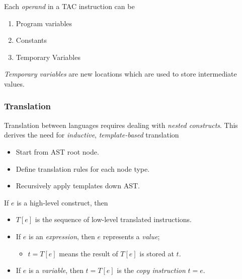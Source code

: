 \begin{definition}
    Each \textit{operand} in a TAC instruction can be
    \begin{enumerate}
        \item Program variables
        \item Constants
        \item Temporary Variables
    \end{enumerate}
\end{definition}

\begin{definition}
    \textit{Temporary variables} are new locations which are used to store intermediate values.
\end{definition}

\subsubsection{Translation}

\begin{definition}[Translation]
    Translation between languages requires dealing with \textit{nested constructs}. This derives the need for \textit{inductive}, \textit{template-based} translation
    \begin{itemize}
        \item Start from AST root node.
        \item Define translation rules for each node type.
        \item Recursively apply templates down AST.
    \end{itemize}
\end{definition}

\begin{definition}
    If $e$ is a high-level construct, then
    \begin{itemize}
        \item $T[e]$ is the sequence of  low-level translated instructions.
        \item If $e$ is an \textit{expression}, then $e$ represents a \textit{value};
        \begin{itemize}
           \item $t = T[e]$ means the result of $T[e]$ is stored at $t$.
        \end{itemize}
        \item If $e$ is a \textit{variable}, then $t = T[e]$ is the \textit{copy instruction} $t = e$.
    \end{itemize}
\end{definition}

